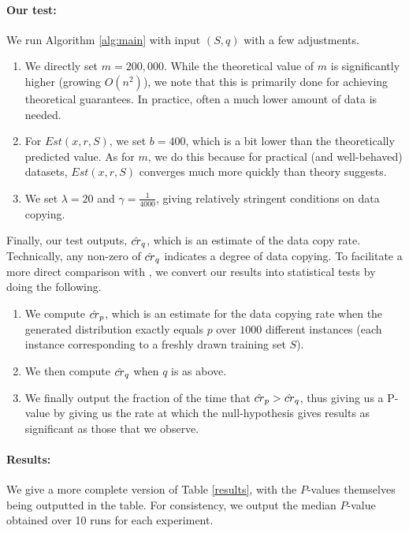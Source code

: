 \paragraph{Our test:} We run Algorithm \ref{alg:main} with input $(S, q)$ with a few adjustments.
\begin{enumerate}
	\item We directly set $m = 200,000$. While the theoretical value of $m$ is significantly higher (growing $O(n^2)$), we note that this is primarily done for achieving theoretical guarantees. In practice, often a much lower amount of data is needed.
	\item For $Est(x, r, S)$, we set $b= 400$, which is a bit lower than the theoretically predicted value. As for $m$, we do this because for practical (and well-behaved) datasets, $Est(x, r, S)$ converges much more quickly than theory suggests. 
	\item We set $\lambda = 20$ and $\gamma = \frac{1}{4000}$, giving relatively stringent conditions on data copying. 
\end{enumerate}
Finally, our test outputs, $\hat{cr}_q$, which is an estimate of the data copy rate. Technically, any non-zero of $\hat{cr}_q$ indicates a degree of data copying. To facilitate a more direct comparison with \cite{MCD2020}, we convert our results into statistical tests by doing the following.
\begin{enumerate}
	\item We compute $\hat{cr}_p$, which is an estimate for the data copying rate when the generated distribution exactly equals $p$ over $1000$ different instances (each instance corresponding to a freshly drawn training set $S$).
	\item We then compute $\hat{cr}_q$ when $q$ is as above.
	\item We finally output the fraction of the time that $\hat{cr}_p > \hat{cr}_q$, thus giving us a P-value by giving us the rate at which the null-hypothesis gives results as significant as those that we observe. 
\end{enumerate} 

\paragraph{Results:} We give a more complete version of Table \ref{results}, with the $P$-values themselves being outputted in the table. For consistency, we output the median $P$-value obtained over 10 runs for each experiment. 

